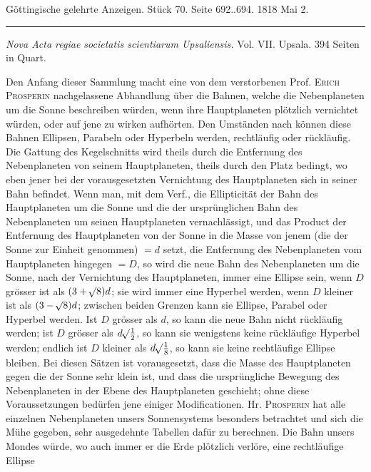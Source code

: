 \clearpage
{}
\hypertarget{native-609-lower}{}
\begin{center}\small Göttingische gelehrte Anzeigen. Stück 70. Seite 692..694. 1818 Mai 2.\\[3pt]\rule{.72\linewidth}{.3pt}\end{center}

\emph{Nova Acta regiae societatis scientiarum Upsaliensis.} Vol. VII. Upsala. 394 Seiten in Quart.

Den Anfang dieser Sammlung macht eine von dem verstorbenen Prof. \textsc{Erich Prosperin} nachgelassene Abhandlung über die Bahnen, welche die Nebenplaneten um die Sonne beschreiben würden,
wenn ihre Hauptplaneten plötzlich vernichtet würden, oder auf jene zu wirken aufhörten. Den Umständen nach können diese Bahnen Ellipsen, Parabeln oder Hyperbeln werden, rechtläufig oder rückläufig. Die Gattung des Kegelschnitts wird theils durch die Entfernung des Nebenplaneten von seinem
Hauptplaneten, theils durch den Platz bedingt, wo eben jener bei der vorausgesetzten Vernichtung des
Hauptplaneten sich in seiner Bahn befindet. Wenn man, mit dem Verf., die Ellipticität der Bahn des
Hauptplaneten um die Sonne und die der ursprünglichen Bahn des Nebenplaneten um seinen Hauptplaneten vernachlässigt, und das Product der Entfernung des Hauptplaneten von der Sonne in die Masse
von jenem (die der Sonne zur Einheit genommen) $= d$ setzt, die Entfernung des Nebenplaneten vom
Hauptplaneten hingegen $= D$, so wird die neue Bahn des Nebenplaneten um die Sonne, nach der Vernichtung des Hauptplaneten, immer eine Ellipse sein, wenn $D$ grösser ist als $(3+\mathord{{}^{}\!\surd}8)d$; sie wird immer eine Hyperbel werden, wenn $D$ kleiner ist als $(3-\mathord{{}^{}\!\surd}8)d$; zwischen beiden Grenzen kann sie Ellipse, Parabel oder Hyperbel werden. Ist $D$ grösser als $d$, so kann die neue Bahn nicht rückläufig
werden; ist $D$ grösser als $d\mathord{{}^{}\!\surd}\tfrac{1}{2}$, so kann sie wenigstens keine rückläufige Hyperbel werden; endlich ist
$D$ kleiner als $d\mathord{{}^{}\!\surd}\tfrac{1}{8}$, 
so kann sie keine rechtläufige Ellipse bleiben. Bei diesen Sätzen ist vorausgesetzt,
dass die Masse des Hauptplaneten gegen die der Sonne sehr klein ist, und dass die ursprüngliche Bewegung des Nebenplaneten in der Ebene des Hauptplaneten geschieht; ohne diese Voraussetzungen bedürfen jene einiger Modificationen. Hr. \textsc{Prosperin} hat alle einzelnen Nebenplaneten unsers Sonnensystems besonders betrachtet und sich die Mühe gegeben, sehr ausgedehnte Tabellen dafür zu berechnen.
Die Bahn unsers Mondes würde, wo auch immer er die Erde plötzlich verlöre, eine rechtläufige Ellipse
